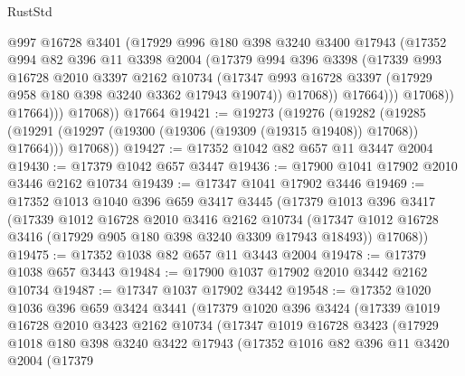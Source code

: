 \begin{lexlean}{RustStd}
\begin{coremodule}
                    @997
                    @16728
                    @3401
                    (@17929
                      @996
                      @180
                      @398
                      @3240
                      @3400
                      @17943
                      (@17352
                        @994
                        @82
                        @396
                        @11
                        @3398
                        @2004
                        (@17379
                          @994
                          @396
                          @3398
                          (@17339
                            @993
                            @16728
                            @2010
                            @3397
                            @2162
                            @10734
                            (@17347
                              @993
                              @16728
                              @3397
                              (@17929 @958 @180 @398 @3240 @3362 @17943 @19074))
                            @17068))
                        @17664)))
                  @17068))
              @17664)))
        @17068))
    @17664
@19421 := @19273
    (@19276
      (@19282
        (@19285 (@19291 (@19297 (@19300 (@19306 (@19309 (@19315 @19408)) @17068)) @17664)))
        @17068))
@19427 := @17352 @1042 @82 @657 @11 @3447 @2004
@19430 := @17379 @1042 @657 @3447
@19436 := @17900 @1041 @17902 @2010 @3446 @2162 @10734
@19439 := @17347 @1041 @17902 @3446
@19469 := @17352
    @1013
    @1040
    @396
    @659
    @3417
    @3445
    (@17379
      @1013
      @396
      @3417
      (@17339
        @1012
        @16728
        @2010
        @3416
        @2162
        @10734
        (@17347 @1012 @16728 @3416 (@17929 @905 @180 @398 @3240 @3309 @17943 @18493))
        @17068))
@19475 := @17352 @1038 @82 @657 @11 @3443 @2004
@19478 := @17379 @1038 @657 @3443
@19484 := @17900 @1037 @17902 @2010 @3442 @2162 @10734
@19487 := @17347 @1037 @17902 @3442
@19548 := @17352
    @1020
    @1036
    @396
    @659
    @3424
    @3441
    (@17379
      @1020
      @396
      @3424
      (@17339
        @1019
        @16728
        @2010
        @3423
        @2162
        @10734
        (@17347
          @1019
          @16728
          @3423
          (@17929
            @1018
            @180
            @398
            @3240
            @3422
            @17943
            (@17352
              @1016
              @82
              @396
              @11
              @3420
              @2004
              (@17379

\end{coremodule}
\end{lexlean}
